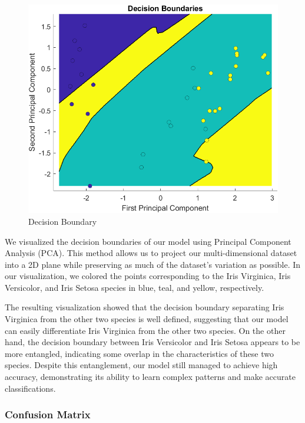 \documentclass[conference]{inc/IEEEtran}
\begin{document}
\begin{figure}
  \includegraphics[width=\linewidth]{figures/DB.png}
  \caption{Decision Boundary}
  \label{fig:boat1}
\end{figure}

We visualized the decision boundaries of our model using Principal Component Analysis (PCA). This method allows us to project our multi-dimensional dataset into a 2D plane while preserving as much of the dataset's variation as possible. In our visualization, we colored the points corresponding to the Iris Virginica, Iris Versicolor, and Iris Setosa species in blue, teal, and yellow, respectively.

The resulting visualization showed that the decision boundary separating Iris Virginica from the other two species is well defined, suggesting that our model can easily differentiate Iris Virginica from the other two species. On the other hand, the decision boundary between Iris Versicolor and Iris Setosa appears to be more entangled, indicating some overlap in the characteristics of these two species. Despite this entanglement, our model still managed to achieve high accuracy, demonstrating its ability to learn complex patterns and make accurate classifications.



\subsubsection{Confusion Matrix}
\end{document}
